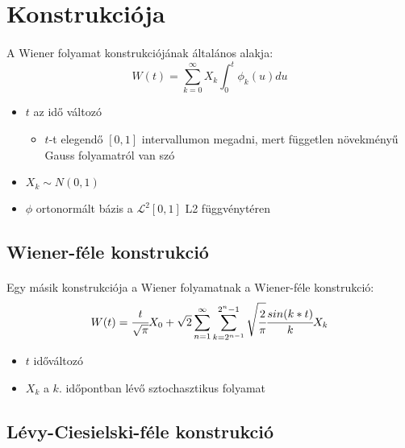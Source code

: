\documentclass[11pt,a4paper]{article}
\begin{document}
			\section[Wiener-folyamat konstrukciója]{Konstrukciója}
				\paragraph{}
					A Wiener folyamat konstrukciójának általános alakja:
					$$W(t) = \sum_{k=0}^{\infty}X_k \int_0^t \phi_k (u) du$$
					\begin{itemize}
						\item $t$ az idő változó
						\begin{itemize}
							\item $t$-t elegendő $[0,1]$ intervallumon megadni, mert független növekményű Gauss folyamatról van szó
						\end{itemize}
						\item $X_k \sim N(0,1)$
						\item $\phi$ ortonormált bázis a $\mathcal{L}^2[0,1]$ L2 függvénytéren
					\end{itemize}
				\subsection{Wiener-féle konstrukció}
					\paragraph{}
						Egy másik konstrukciója a Wiener folyamatnak a Wiener-féle konstrukció:
						$$W(t) = \cfrac{t}{\sqrt{\pi}} X_0 + \sqrt{2} \sum_{n=1}^\infty \sum_{k = 2^{n-1}}^{2^n-1}\sqrt{\cfrac{2}{\pi}}\cfrac{sin(k*t)}{k} X_k$$
						\begin{itemize}
							\item $t$ időváltozó
							\item $X_k$ a $k.$ időpontban lévő sztochasztikus folyamat
						\end{itemize}
				\subsection{Lévy-Ciesielski-féle konstrukció}
\end{document}
